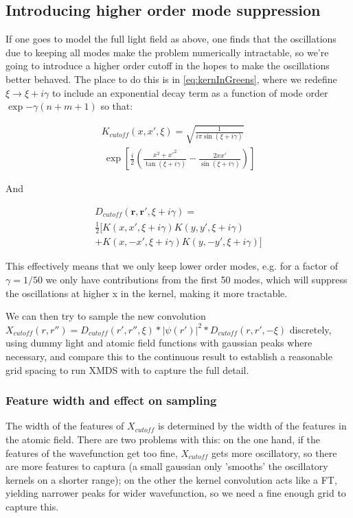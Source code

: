 \documentclass[a4paper,twocolumn,nobalancelastpage]{revtex4-1}
\begin{document}
\subsection{Introducing higher order mode suppression}

If one goes to model the full light field as above, one finds that the oscillations due to keeping all modes make the problem numerically intractable, so we're going to introduce a higher order cutoff in the hopes to make the oscillations better behaved.
The place to do this is in \ref{eq:kernInGreens}, where we redefine $\xi\rightarrow\xi+i\gamma$ to include an exponential decay term as a function of mode order $\exp{-\gamma(n+m+1)}$ so that:

\begin{multline}
K_{cutoff}(x,x',\xi)=\sqrt{\frac{1}{i \pi \sin(\xi+i \gamma)}} \\\ \exp{\left[ 
\frac{i}{2} \left(
\frac{x^2+x'^2}{\tan(\xi+i \gamma)}-\frac{2 x x'}{\sin(\xi+i \gamma)}
\right) \right] }
\end{multline}

And 

\begin{multline}
D_{cutoff}(\textbf{r},\textbf{r}',\xi+i \gamma)=\\ \frac{1}{2} \big[ K(x,x',\xi+i \gamma)K(y,y',\xi+i \gamma)\\+ K(x,-x',\xi+i \gamma)K(y,-y',\xi+i \gamma) \big]
\end{multline}

This effectively means that we only keep lower order modes, e.g. for a factor of $\gamma=1/50$ we only have contributions from the first 50 modes, which will suppress the oscillations at higher x in the kernel, making it more tractable.

We can then try to sample the new convolution $X_{cutoff}(r,r'')=D_{cutoff}(r',r'',\xi) * |\psi(r')|^2 * D_{cutoff}(r,r',-\xi)$ discretely, using dummy light and atomic field functions with gaussian peaks where necessary, and compare this to the continuous result to establish a reasonable grid spacing to run XMDS with to capture the full detail.


\subsubsection{Feature width and effect on sampling}

The width of the features of $X_{cutoff}$ is determined by the width of the features in the atomic field. There are two problems with this: on the one hand, if the features of the wavefunction get too fine, $X_{cutoff}$ gets more oscillatory, so there are more features to captura (a small gaussian only 'smooths' the oscillatory kernels on a shorter range); on the other the kernel convolution acts like a FT, yielding narrower peaks for wider wavefunction, so we need a fine enough grid to capture this.
\end{document}
